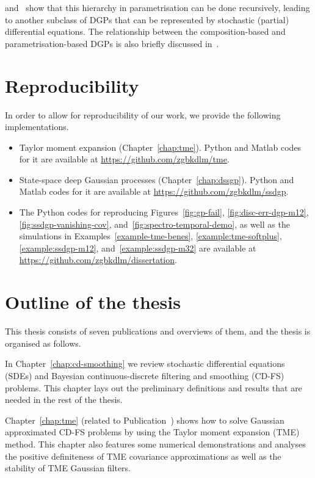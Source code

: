 \citet{Zhao2020SSDGP} and~\citet{Emzir2020} show that this hierarchy in parametrisation can be done recursively, leading to another subclass of DGPs that can be represented by stochastic (partial) differential equations. The relationship between the composition-based and parametrisation-based DGPs is also briefly discussed in~\citet{Dunlop2018JMLR}.

\section{Reproducibility}
\label{sec:codes}
In order to allow for reproducibility of our work, we provide  the following implementations.

\begin{itemize}
	\item Taylor moment expansion (Chapter~\ref{chap:tme}). Python and Matlab codes for it are available at \href{https://github.com/zgbkdlm/tme}{https://github.com/zgbkdlm/tme}.
	\item State-space deep Gaussian processes (Chapter~\ref{chap:dssgp}). Python and Matlab codes for it are available at \href{https://github.com/zgbkdlm/ssdgp}{https://github.com/zgbkdlm/ssdgp}.
	\item The Python codes for reproducing Figures~\ref{fig:gp-fail}, \ref{fig:disc-err-dgp-m12}, \ref{fig:ssdgp-vanishing-cov}, and~\ref{fig:spectro-temporal-demo}, as well as the simulations in Examples~\ref{example-tme-benes}, \ref{example:tme-softplus}, \ref{example:ssdgp-m12}, and~\ref{example:ssdgp-m32} are available at \href{https://github.com/zgbkdlm/dissertation}{https://github.com/zgbkdlm/dissertation}.
\end{itemize}

\section{Outline of the thesis}
\label{sec:outline}
This thesis consists of seven publications and overviews of them, and the thesis is organised as follows.

In Chapter~\ref{chap:cd-smoothing} we review stochastic differential equations (SDEs) and Bayesian continuous-discrete filtering and smoothing (CD-FS) problems. This chapter lays out the preliminary definitions and results that are needed in the rest of the thesis. 

Chapter~\ref{chap:tme} (related to Publication~) shows how to solve Gaussian approximated CD-FS problems by using the Taylor moment expansion (TME) method. This chapter also features some numerical demonstrations and analyses the positive definiteness of TME covariance approximations as well as the stability of TME Gaussian filters.

